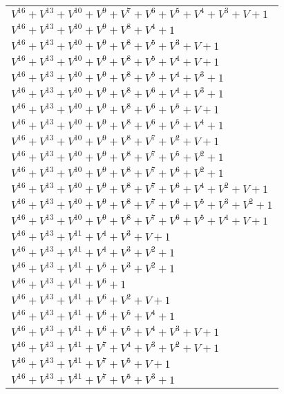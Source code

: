 \documentclass[12pt]{article}
\begin{document}
\begin{adjustwidth}{-4cm}{}
\begin{center}
\begin{longtable}{|l|}
$V^{16}  +V^{13}  +V^{10}  +V^{9}  +V^{7}  +V^{6}  +V^{5}  +V^{4}  +V^{3}  + V + 1$ \\
$V^{16}  +V^{13}  +V^{10}  +V^{9}  +V^{8}  +V^{4}  + 1$ \\
$V^{16}  +V^{13}  +V^{10}  +V^{9}  +V^{8}  +V^{5}  +V^{3}  + V + 1$ \\
$V^{16}  +V^{13}  +V^{10}  +V^{9}  +V^{8}  +V^{5}  +V^{4}  + V + 1$ \\
$V^{16}  +V^{13}  +V^{10}  +V^{9}  +V^{8}  +V^{5}  +V^{4}  +V^{3}  + 1$ \\
$V^{16}  +V^{13}  +V^{10}  +V^{9}  +V^{8}  +V^{6}  +V^{4}  +V^{3}  + 1$ \\
$V^{16}  +V^{13}  +V^{10}  +V^{9}  +V^{8}  +V^{6}  +V^{5}  + V + 1$ \\
$V^{16}  +V^{13}  +V^{10}  +V^{9}  +V^{8}  +V^{6}  +V^{5}  +V^{4}  + 1$ \\
$V^{16}  +V^{13}  +V^{10}  +V^{9}  +V^{8}  +V^{7}  +V^{2}  + V + 1$ \\
$V^{16}  +V^{13}  +V^{10}  +V^{9}  +V^{8}  +V^{7}  +V^{5}  +V^{2}  + 1$ \\
$V^{16}  +V^{13}  +V^{10}  +V^{9}  +V^{8}  +V^{7}  +V^{6}  +V^{2}  + 1$ \\
$V^{16}  +V^{13}  +V^{10}  +V^{9}  +V^{8}  +V^{7}  +V^{6}  +V^{4}  +V^{2}  + V + 1$ \\
$V^{16}  +V^{13}  +V^{10}  +V^{9}  +V^{8}  +V^{7}  +V^{6}  +V^{5}  +V^{3}  +V^{2}  + 1$ \\
$V^{16}  +V^{13}  +V^{10}  +V^{9}  +V^{8}  +V^{7}  +V^{6}  +V^{5}  +V^{4}  + V + 1$ \\
$V^{16}  +V^{13}  +V^{11}  +V^{4}  +V^{3}  + V + 1$ \\
$V^{16}  +V^{13}  +V^{11}  +V^{4}  +V^{3}  +V^{2}  + 1$ \\
$V^{16}  +V^{13}  +V^{11}  +V^{5}  +V^{3}  +V^{2}  + 1$ \\
$V^{16}  +V^{13}  +V^{11}  +V^{6}  + 1$ \\
$V^{16}  +V^{13}  +V^{11}  +V^{6}  +V^{2}  + V + 1$ \\
$V^{16}  +V^{13}  +V^{11}  +V^{6}  +V^{5}  +V^{4}  + 1$ \\
$V^{16}  +V^{13}  +V^{11}  +V^{6}  +V^{5}  +V^{4}  +V^{3}  + V + 1$ \\
$V^{16}  +V^{13}  +V^{11}  +V^{7}  +V^{4}  +V^{3}  +V^{2}  + V + 1$ \\
$V^{16}  +V^{13}  +V^{11}  +V^{7}  +V^{5}  + V + 1$ \\
$V^{16}  +V^{13}  +V^{11}  +V^{7}  +V^{5}  +V^{3}  + 1$ \\

\end{longtable}
\end{center}
\end{adjustwidth}
\end{document}
